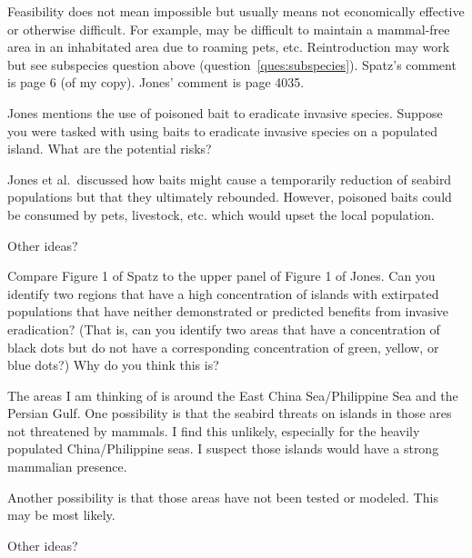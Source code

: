 \documentclass[11pt, addpoints]{exam}
\begin{document}
\begin{questions}
\begin{solution}
	Feasibility does not mean impossible but usually means not economically effective or otherwise difficult. For example, may be difficult to maintain a mammal-free area in an inhabitated area due to roaming pets, etc. Reintroduction may work but see subspecies question above (question~\ref{ques:subspecies}). Spatz's comment is page 6 (of my copy). Jones' comment is page 4035. 
\end{solution}


\question[5]
Jones mentions the use of poisoned bait to eradicate invasive species. Suppose you were tasked with using baits to eradicate invasive species on a populated island. What are the potential risks?

\begin{solution}
	Jones et al.~discussed how baits might cause a temporarily reduction of seabird populations but that they ultimately rebounded. However, poisoned baits could be consumed by pets, livestock, etc. which would upset the local population.
	
	Other ideas?
\end{solution}


\question[5]
Compare Figure 1 of Spatz to the upper panel of Figure 1 of Jones. Can you identify two regions that have a high concentration of islands with extirpated populations that have neither demonstrated or predicted benefits from invasive eradication? (That is, can you identify two areas that have a concentration of black dots but do not have a corresponding concentration of green, yellow, or blue dots?) Why do you think this is?

\begin{solution}
	The areas I am thinking of is around the East China Sea/Philippine Sea and the Persian Gulf. One possibility is that the seabird threats on islands in those ares not threatened by mammals. I find this unlikely, especially for the heavily populated China/Philippine seas. I suspect those islands would have a strong mammalian presence. 
	
	Another possibility is that those areas have not been tested or modeled. This may be most likely.
	
	Other ideas?
\end{solution}


\end{questions}
\end{document}
